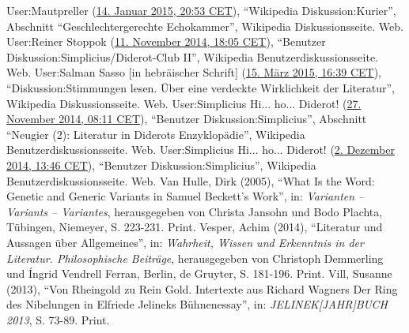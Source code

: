 \documentclass[fontsize=12pt]{scrartcl}
\begin{document}
{{{{\begin{thebibliography}
	User:Mautpreller (\href{https://de.wikipedia.org/w/index.php?title=Wikipedia_Diskussion:Kurier\&diff=prev\&oldid=137785144}{14. Januar 2015, 20:53 CET}), "`Wi\-ki\-pe\-dia Dis\-kus\-si\-on:Kurier"', Abschnitt "`Geschlechtergerechte Echokammer"', Wi\-ki\-pe\-dia Dis\-kus\-si\-ons\-seite. Web.
	User:Reiner Stoppok (\href{https://de.wikipedia.org/w/index.php?title=Benutzer:Simplicius/Diderot-Club_II\&diff=prev\&oldid=135727987}{11. November 2014, 18:05 CET}), "`Be\-nut\-zer Dis\-kus\-si\-on:Simplicius/Diderot-Club II"', Wi\-ki\-pe\-dia Be\-nut\-zer\-dis\-kus\-si\-onsseite. Web. 
	User:Salman Sasso [in hebr\"aischer Schrift] (\href{https://de.wikipedia.org/w/index.php?title=Diskussion:Stimmungen_lesen._\%C3\%9Cber_eine_verdeckte_Wirklichkeit_der_Literatur\&diff=next\&oldid=139801823}{15. M\"arz 2015, 16:39 CET}), "`Diskussion:Stimmungen lesen. \"Uber eine verdeckte Wirklichkeit der Literatur"', Wi\-ki\-pe\-dia Dis\-kus\-sions\-sei\-te. Web.
	User:Simplicius Hi... ho... Diderot! (\href{https://de.wikipedia.org/w/index.php?title=Benutzer_Diskussion:Simplicius\&diff=next\&oldid=136226937}{27. November 2014, 08:11 CET}), "`Be\-nut\-zer Dis\-kus\-si\-on:Simplicius"', Abschnitt "`Neugier (2): Li\-te\-ra\-tur in Diderots Enzy\-klop\"adie"', Wi\-ki\-pe\-dia Be\-nut\-zerdis\-kus\-si\-onsseite. Web.
	User:Simplicius Hi... ho... Diderot! (\href{http://de.wikipedia.org/w/index.php?title=Benutzer_Diskussion:Simplicius\&diff=next\&oldid=136395255}{2. Dezember 2014, 13:46 CET}), "`Be\-nut\-zer Dis\-kus\-si\-on:Simplicius"', Wi\-ki\-pe\-dia Be\-nut\-zerdis\-kus\-si\-onsseite. Web.
	Van Hulle, Dirk (2005), "`What Is the Word: Genetic and Generic Variants in Samuel Be\-ckett's Work"', in: \textit{Varianten -- Variants -- Variantes}, he\-rausgegeben von Christa Jansohn und Bodo Plachta, T\"ubingen, Niemeyer, S. 223-231. Print.
	Vesper, Achim (2014), "`Li\-te\-ra\-tur und Aussagen \"uber Allgemeines"', in: \textit{Wahrheit, Wissen und Erkenntnis in der Li\-te\-ra\-tur. Philosophische Beitr\"age}, he\-rausgegeben von Christoph Demmerling und \'{I}ngrid Vendrell Ferran, Berlin, de Gruyter, S. 181-196. Print.
	Vill, Susanne (2013), "`Von Rheingold zu Rein Gold. Intertexte aus Richard Wagners Der Ring des Nibelungen in Elfriede Jelineks B\"uhnenessay"', in: \textit{JELINEK[JAHR]\-BUCH 2013}, S. 73-89. Print.

\end{thebibliography}}}}}
\end{document}
